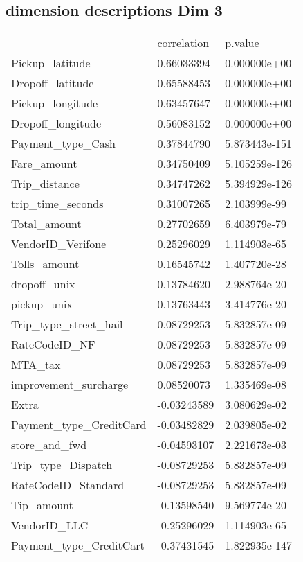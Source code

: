\documentclass{article}
\begin{document}
\subsection{dimension descriptions Dim 3}
\label{my-label}
\begin{tabular}{lll}
 & correlation   &    p.value \\
Pickup\_latitude         &  0.66033394 &  0.000000e+00  \\
Dropoff\_latitude        &  0.65588453 &  0.000000e+00 \\
Pickup\_longitude        &  0.63457647 &  0.000000e+00 \\
Dropoff\_longitude       &  0.56083152 &  0.000000e+00 \\
Payment\_type\_Cash       &  0.37844790 & 5.873443e-151 \\
Fare\_amount             &  0.34750409 & 5.105259e-126 \\
Trip\_distance           &  0.34747262 & 5.394929e-126 \\
trip\_time\_seconds       &  0.31007265  & 2.103999e-99 \\
Total\_amount            &  0.27702659  & 6.403979e-79 \\
VendorID\_Verifone       &  0.25296029  & 1.114903e-65 \\
Tolls\_amount            &  0.16545742  & 1.407720e-28 \\
dropoff\_unix            &  0.13784620  & 2.988764e-20 \\
pickup\_unix             &  0.13763443  & 3.414776e-20 \\
Trip\_type\_street\_hail   &  0.08729253  & 5.832857e-09 \\
RateCodeID\_NF           &  0.08729253  & 5.832857e-09 \\
MTA\_tax                 &  0.08729253  & 5.832857e-09 \\
improvement\_surcharge   &  0.08520073  & 1.335469e-08 \\
Extra                   & -0.03243589  & 3.080629e-02 \\
Payment\_type\_CreditCard & -0.03482829  & 2.039805e-02 \\
store\_and\_fwd           & -0.04593107  & 2.221673e-03 \\
Trip\_type\_Dispatch      & -0.08729253  & 5.832857e-09 \\
RateCodeID\_Standard     & -0.08729253  & 5.832857e-09 \\
Tip\_amount              & -0.13598540  & 9.569774e-20 \\
VendorID\_LLC            & -0.25296029  & 1.114903e-65 \\
Payment\_type\_CreditCart & -0.37431545 & 1.822935e-147
\end{tabular}
\end{document}
